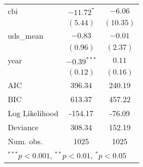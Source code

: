 \begin{tabular}{l c c }
cbi                             & $-11.72^{*}$   & $-6.06$     \\
                                & $(5.44)$       & $(10.35)$   \\
uds\_mean                       & $-0.83$        & $-0.01$     \\
                                & $(0.96)$       & $(2.37)$    \\
year                            & $-0.39^{***}$  & $0.11$      \\
                                & $(0.12)$       & $(0.16)$    \\
\hline
AIC                             & 396.34         & 240.19      \\
BIC                             & 613.37         & 457.22      \\
Log Likelihood                  & -154.17        & -76.09      \\
Deviance                        & 308.34         & 152.19      \\
Num. obs.                       & 1025           & 1025        \\
\hline
\multicolumn{3}{l}{\scriptsize{$^{***}p<0.001$, $^{**}p<0.01$, $^*p<0.05$}}
\end{tabular}
